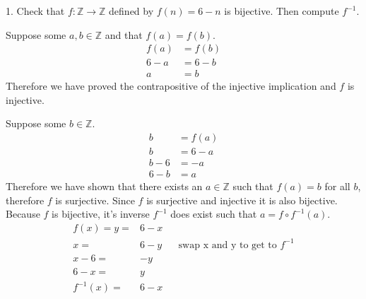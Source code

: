\documentclass{hippoidC}
\begin{document}
\toc
\thispagestyle{styleTOC}
\pagebreak
\pagestyle{styleE}

\begin{prooflist}{1. Check that $f: \mathbb{Z} \rightarrow \mathbb{Z}$ defined
		by $f(n)=6-n$ is bijective. Then compute $f^{-1}$.}
	\inj{}
	\item Suppose some $a, b \in \mathbb{Z}$ and that $f(a) = f(b)$.
	\begin{align*}
		f(a) & =f(b) \\
		6-a  & =6-b  \\
		a    & =b
	\end{align*}
	Therefore we have proved the contrapositive of the injective implication and $f$
	is injective.
	\surj{}
	\item Suppose some $b\in \mathbb{Z}$.
	\begin{align*}
		b   & =f(a) \\
		b   & =6-a  \\
		b-6 & =-a   \\
		6-b & =a
	\end{align*}
	Therefore we have shown that there exists an $a\in\mathbb{Z}$ such that $f(a)=b$
	for all $b$, therefore $f$ is surjective. Since $f$ is surjective and injective
	it is also bijective. Because $f$ is bijective, it's inverse $f^{-1}$ does exist
	such that $a=f\circ f^{-1}(a)$.
	\begin{align*}
		f(x)=y=    & 6-x                                           \\
		x=         & 6-y &  & \text{swap x and y to get to }f^{-1} \\
		x-6=       & -y                                            \\
		6-x=       & y                                             \\
		f^{-1}(x)= & 6-x
	\end{align*}
\end{prooflist}
\end{document}

